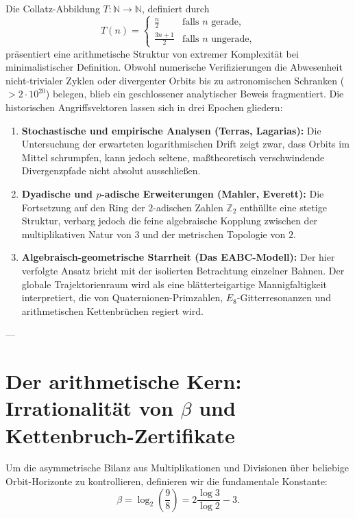 \documentclass[11pt,a4paper]{article}
\theoremstyle{definition}
\begin{document}
	Die Collatz-Abbildung $T: \mathbb{N} \to \mathbb{N}$, definiert durch
	\begin{equation}
		T(n) = \begin{cases}
			\frac{n}{2} & \text{falls } n \text{ gerade,} \\
			\frac{3n+1}{2} & \text{falls } n \text{ ungerade,}
		\end{cases}
	\end{equation}
	präsentiert eine arithmetische Struktur von extremer Komplexität bei minimalistischer Definition. Obwohl numerische Verifizierungen die Abwesenheit nicht-trivialer Zyklen oder divergenter Orbits bis zu astronomischen Schranken ($>2\cdot 10^{20}$) belegen, blieb ein geschlossener analytischer Beweis fragmentiert. Die historischen Angriffsvektoren lassen sich in drei Epochen gliedern:
	\begin{enumerate}
		\item \textbf{Stochastische und empirische Analysen (Terras, Lagarias):} Die Untersuchung der erwarteten logarithmischen Drift zeigt zwar, dass Orbits im Mittel schrumpfen, kann jedoch seltene, maßtheoretisch verschwindende Divergenzpfade nicht absolut ausschließen.
		\item \textbf{Dyadische und $p$-adische Erweiterungen (Mahler, Everett):} Die Fortsetzung auf den Ring der $2$-adischen Zahlen $\mathbb{Z}_2$ enthüllte eine stetige Struktur, verbarg jedoch die feine algebraische Kopplung zwischen der multiplikativen Natur von $3$ und der metrischen Topologie von $2$.
		\item \textbf{Algebraisch-geometrische Starrheit (Das EABC-Modell):} Der hier verfolgte Ansatz bricht mit der isolierten Betrachtung einzelner Bahnen. Der globale Trajektorienraum wird als eine blätterteigartige Mannigfaltigkeit interpretiert, die von Quaternionen-Primzahlen, $E_8$-Gitterresonanzen und arithmetischen Kettenbrüchen regiert wird.
	\end{enumerate}
	
	---
	
	\section{Der arithmetische Kern: Irrationalität von $\beta$ und Kettenbruch-Zertifikate}
	
	Um die asymmetrische Bilanz aus Multiplikationen und Divisionen über beliebige Orbit-Horizonte zu kontrollieren, definieren wir die fundamentale Konstante:
	\begin{equation}
		\beta = \log_2 \left(\frac{9}{8}\right) = 2 \frac{\log 3}{\log 2} - 3.
	\end{equation}
	
\end{document}
